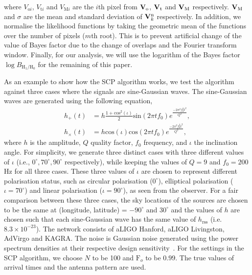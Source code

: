 \documentclass[aps,twocolumn,showpacs,groupedaddress, nofootinbib]{revtex4}  %
\begin{document}
where $V_{\text{o}i}$, $V_{\text{t}i}$ and $V_{\text{M}i}$ are the $i$th pixel from 
$\bold{V}_{\text{o}}$, $\bold{V}_{\text{t}}$ and $\bold{V}_{\text{M}}$ respectively.
$\bold{V}_{\text{M}}$ and $\sigma$ are the mean and standard deviation of $\bold{V}_{k}^{\text{n}}$ respectively. 
In addition, we normalise the likelihood functions by taking the geometric mean of the functions over the number of pixels ($m$th root).
This is to prevent artificial change of the value of Bayes factor due to the change of overlaps and the Fourier transform window.
Finally, for our analysis, we will use the logarithm of the Bayes factor $\log B_{\text{H}_1 / \text{H}_0}$ for the remaining of this paper.

As an example to show how the \ac{SCP} algorithm works, we test the algorithm against three cases where the signals are sine-Gaussian waves.
The sine-Gaussian waves are generated using the following equation,
\begin{align}\label{eq:singau}
 h_{+}(t) &= h\frac{1 + \text{cos}^2(\iota)}{2}\text{sin}(2\pi t f_0) e^{\frac{-2 \pi^2  f^2_0 t^2 }{Q^2}},\nonumber \\
 h_{\times}(t) &= h \text{cos}(\iota)\text{cos}(2\pi t f_0) e^{\frac{-2 \pi^2  f^2_0 t^2 }{Q^2}},
\end{align}
where $h$ is the amplitude, $Q$ quality factor, $f_0$  frequency, and $\iota$ the inclination angle.
For simplicity, we generate three distinct cases with three different values of $\iota$ (i.e., $0^{\circ}, 70^{\circ}, 90^{\circ}$ respectively), 
while keeping the values of $Q = 9$ and  $f_0 = 200$Hz for all three cases.
These three values of $\iota$ are chosen to represent different polarisation status, such as circular polarisation ($0^{\circ}$), 
elliptical polarisation ($\iota = 70^{\circ}$) and linear polarisation ($\iota = 90^{\circ}$), as seen from the observer.
For a fair comparison between these three cases, the sky locations of the sources are chosen to be the same at (longitude, latitude) = $-90^\circ$ and $30^\circ$ and 
the values of $h$ are chosen  such that each sine-Gaussian wave has the same value of $h_\text{rss}$ (i.e. $8.3\times10^{-23}$).
The network consists of \ac{aLIGO} Hanford, \ac{aLIGO} Livingston, \ac{AdVirgo} and KAGRA. 
The noise is Gaussian noise generated using the power spectrum densities at their respective design sensitivity~\cite{abbott2018prospects, acernese2014advanced, akutsu2018kagra}.
For the settings in the \ac{SCP} algorithm, we choose $N$ to be 100 and $\text{F}_o$ to be $0.99$. 
The true values of arrival times and the antenna pattern are used.
\end{document}
